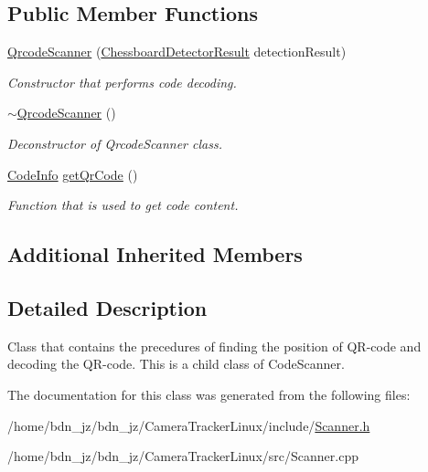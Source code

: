 \subsection*{Public Member Functions}
\begin{DoxyCompactItemize}
\item 
\mbox{\label{classQrcodeScanner_a92f9835aab64e4129ae9efcd72bc7518}} 
\hyperlink{classQrcodeScanner_a92f9835aab64e4129ae9efcd72bc7518}{Qrcode\+Scanner} (\hyperlink{structChessboardDetectorResult}{Chessboard\+Detector\+Result} detection\+Result)
\begin{DoxyCompactList}\small\item\em Constructor that performs code decoding. \end{DoxyCompactList}\item 
\mbox{\label{classQrcodeScanner_ad8670545dad4e8918b94f870f184ce80}} 
\hyperlink{classQrcodeScanner_ad8670545dad4e8918b94f870f184ce80}{$\sim$\+Qrcode\+Scanner} ()
\begin{DoxyCompactList}\small\item\em Deconstructor of Qrcode\+Scanner class. \end{DoxyCompactList}\item 
\mbox{\label{classQrcodeScanner_ae2f75fcf7fbe48678a57c2e0eb3ca163}} 
\hyperlink{structCodeInfo}{Code\+Info} \hyperlink{classQrcodeScanner_ae2f75fcf7fbe48678a57c2e0eb3ca163}{get\+Qr\+Code} ()
\begin{DoxyCompactList}\small\item\em Function that is used to get code content. \end{DoxyCompactList}\end{DoxyCompactItemize}
\subsection*{Additional Inherited Members}


\subsection{Detailed Description}
Class that contains the precedures of finding the position of Q\+R-\/code and decoding the Q\+R-\/code. This is a child class of Code\+Scanner. 

The documentation for this class was generated from the following files\+:\begin{DoxyCompactItemize}
\item 
/home/bdn\+\_\+jz/bdn\+\_\+jz/\+Camera\+Tracker\+Linux/include/\hyperlink{Scanner_8h}{Scanner.\+h}\item 
/home/bdn\+\_\+jz/bdn\+\_\+jz/\+Camera\+Tracker\+Linux/src/Scanner.\+cpp\end{DoxyCompactItemize}
